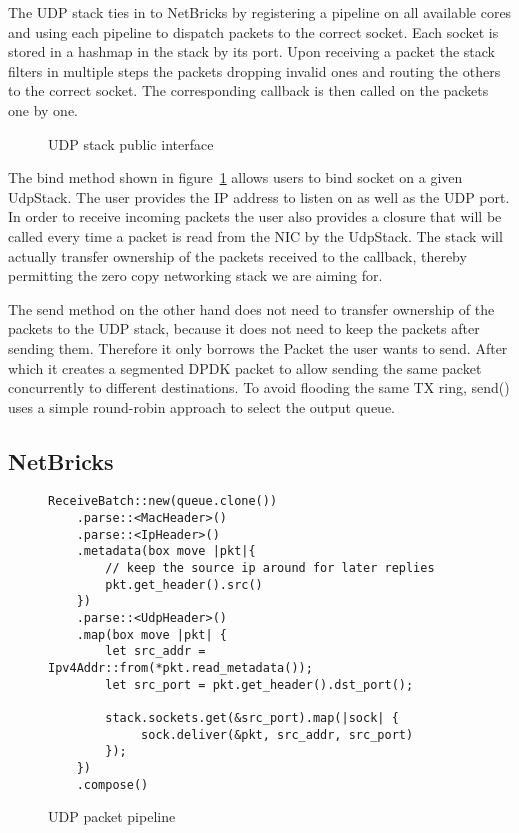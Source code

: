 The UDP stack ties in to NetBricks by registering a pipeline on all
available cores and using each pipeline to dispatch packets to the
correct socket. Each socket is stored in a hashmap in the stack by its
port. Upon receiving a packet the stack filters in multiple steps the
packets dropping invalid ones and routing the others to the correct
socket. The corresponding callback is then called on the packets one
by one.

\begin{figure}[htb!]
  
  \label{fig:bind-send}
  \caption{UDP stack public interface}
\end{figure}

The bind method shown in figure~\ref{fig:bind-send} allows users to
bind socket on a given UdpStack. The user provides the IP address to
listen on as well as the UDP port. In order to receive incoming
packets the user also provides a closure that will be called every
time a packet is read from the NIC by the UdpStack. The stack will
actually transfer ownership of the packets received to the callback,
thereby permitting the zero copy networking stack we are aiming for.

The send method on the other hand does not need to transfer ownership
of the packets to the UDP stack, because it does not need to keep the
packets after sending them. Therefore it only borrows the Packet the
user wants to send. After which it creates a segmented DPDK packet to
allow sending the same packet concurrently to different destinations.
To avoid flooding the same TX ring, send() uses a simple round-robin
approach to select the output queue.


\subsection{NetBricks}

\begin{figure}[htb!]
\begin{lstlisting}
ReceiveBatch::new(queue.clone())
    .parse::<MacHeader>()
    .parse::<IpHeader>()
    .metadata(box move |pkt|{
        // keep the source ip around for later replies
        pkt.get_header().src()
    })
    .parse::<UdpHeader>()
    .map(box move |pkt| {
        let src_addr = Ipv4Addr::from(*pkt.read_metadata());
        let src_port = pkt.get_header().dst_port();

        stack.sockets.get(&src_port).map(|sock| {
             sock.deliver(&pkt, src_addr, src_port)
        });
    })
    .compose()
\end{lstlisting}

  \label{code:udp-pipeline}
  \caption{UDP packet pipeline}
\end{figure}

